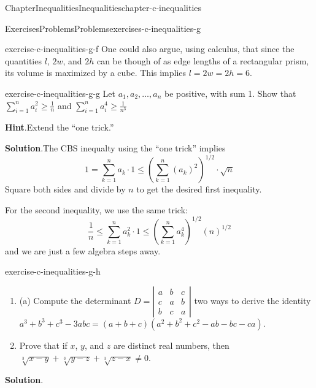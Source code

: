 \documentclass[oneside,10pt,]{book}
\newcommand{\blocktitlefont}{\relax}
\numberwithin{equation}{section}
\begin{document}
\begin{chapterptx}{Chapter}{Inequalities}{}{Inequalities}{}{}{chapter-c-inequalities}
\begin{exercises-section}{Exercises}{Problems}{}{Problems}{}{}{exercises-c-inequalities-g}
\begin{divisionexercise}{5}{}{}{exercise-c-inequalities-g-f}
One could also argue, using calculus, that since the quantities \(l\), \(2w\), and \(2h\)  can be though of as edge lengths of a rectangular prism, its volume is maximized by a cube. This implies \(l = 2w = 2h = 6\).%
\end{divisionexercise}%
\begin{divisionexercise}{6}{}{}{exercise-c-inequalities-g-g}%
Let \(a_1, a_2, \ldots, a_{n }\) be positive, with sum 1.    Show that \(\sum _{i=1}^n a_i^2\geq \frac{1}{n}\)  and   \(\sum _{i=1}^n
a_i^4\geq \frac{1}{n^3}\)%
\par\smallskip%
\noindent\textbf{\blocktitlefont Hint}.\hypertarget{hint-c-inequalities-g-g-b}{}\quad{}Extend the ``one trick.''%
\par\smallskip%
\noindent\textbf{\blocktitlefont Solution}.\hypertarget{solution-c-inequalities-g-g-c}{}\quad{}The CBS inequalty using the ``one trick'' implies%
\begin{equation*}
1=\sum_{k=1}^n a_k \cdot 1 \leq   (\sum_{k=1}^n (a_k)^{2})^{1/2} \cdot \sqrt{n}
\end{equation*}
Square both sides and divide by \(n\) to get the desired first inequality.%
\par
For the second inequality, we use the same trick:%
\begin{equation*}
\frac{1}{n} \leq \sum_{k=1}^n a_k^{2} \cdot 1 \leq \left(\sum_{k=1}^n a_k^{4}\right)^{1/2} \left(n\right)^{1/2} 
\end{equation*}
and we are just a few algebra steps away.%
\end{divisionexercise}%
\begin{divisionexercise}{7}{}{}{exercise-c-inequalities-g-h}%
%
\begin{enumerate}[label=(\alph*)]
\item{}(a)  Compute the determinant \(D= \left| 
\begin{array}{ccc}
a & b & c \\
c & a & b \\
b & c & a 
\end{array} \right|\) two ways to derive the identity \(a^3+b^3+c^3-3 a b c =(a+b+c) \left(a^2+b^2+c^2-a b-b c - c a\right)\).%
\item{}Prove that if \(x\), \(y\), and \(z\) are distinct real numbers, then \(\sqrt[3]{x-y}+ \sqrt[3]{y-z}+\sqrt[3]{z-x}\neq 0\).%
\end{enumerate}
\par\smallskip%
\noindent\textbf{\blocktitlefont Solution}.\hypertarget{solution-c-inequalities-g-h-b}{}\quad{}%

\end{divisionexercise}
\end{exercises-section}
\end{chapterptx}
\end{document}
